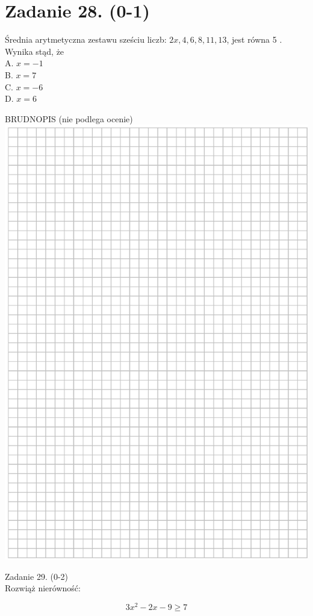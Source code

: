 \documentclass[10pt]{article}
\begin{document}
\section*{Zadanie 28. (0-1)}
Średnia arytmetyczna zestawu sześciu liczb: \(2 x, 4,6,8,11,13\), jest równa 5 . Wynika stąd, że\\
A. \(x=-1\)\\
B. \(x=7\)\\
C. \(x=-6\)\\
D. \(x=6\)

BRUDNOPIS (nie podlega ocenie)\\
\includegraphics[max width=\textwidth, center]{2024_11_21_465acd0c12fa3e05e8a7g-15}

Zadanie 29. (0-2)\\
Rozwiąż nierówność:

\[
3 x^{2}-2 x-9 \geq 7
\]
\end{document}
